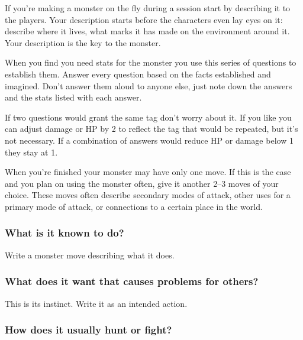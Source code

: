        

If you're making a monster on the fly during a session start by describing it to the players. Your description starts before the characters even lay eyes on it: describe where it lives, what marks it has made on the environment around it. Your description is the key to the monster.

       

When you find you need stats for the monster you use this series of questions to establish them. Answer every question based on the facts established and imagined. Don't answer them aloud to anyone else, just note down the answers and the stats listed with each answer.

       

If two questions would grant the same tag don't worry about it. If you like you can adjust damage or HP by 2 to reflect the tag that would be repeated, but it's not necessary. If a combination of answers would reduce HP or damage below 1 they stay at 1.

       

When you're finished your monster may have only one move. If this is the case and you plan on using the monster often, give it another 2–3 moves of your choice. These moves often describe secondary modes of attack, other uses for a primary mode of attack, or connections to a certain place in the world.

       
\subsubsection{What is it known to do?}  
       

Write a monster move describing what it does.

       
\subsubsection{What does it want that causes problems for others?}   
       

This is its instinct. Write it as an intended action.

       
\subsubsection{How does it usually hunt or fight?}    
       
